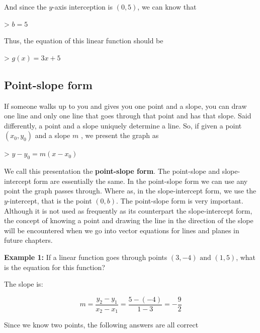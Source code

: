 And since the $y$-axis interception is $(0,5)$, we can know that



> $b=5$



Thus, the equation of this linear function should be



> $g(x)=3x+5$




\subsection{Point-slope form}
\label{sss:poin-288f}




If someone walks up to you and gives you one point and a slope, you can draw one line and
only one line that goes through that point and has that slope. Said differently, a point
and a slope uniquely determine a line. So, if given a point $(x _0,y _0)$ and a slope $m$
, we present the graph as



> $y-y _0=m(x-x _0)$



We call this presentation the \textbf{point-slope form}. The point-slope and
slope-intercept form are essentially the same. In the point-slope form we can use any
point the graph passes through. Where as, in the slope-intercept form, we use the
$y$-intercept, that is the point $(0,b)$. The point-slope form is very important. Although
it is not used as frequently as its counterpart the slope-intercept form, the concept of
knowing a point and drawing the line in the direction of the slope will be encountered
when we go into vector equations for lines and planes in future chapters.



\textbf{Example 1:} If a linear function goes through points $(3,-4)\text{ and }(1,5)$, what is the equation for this function?



The slope is:



$$m=\frac{y _2-y _1}{x _2-x _1}=\frac{5-(-4)}{1-3}=-\frac{9}{2}$$



Since we know two points, the following answers are all correct



